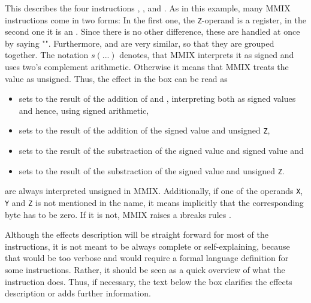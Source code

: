 \noindent This describes the four instructions , ,  and . As in this example, many MMIX instructions come in two forms: In the first one, the {\tt Z}-operand is a register, in the second one it is an . Since there is no other difference, these are handled at once by saying "". Furthermore,  and  are very similar, so that they are grouped together. The notation $s(...)$ denotes, that MMIX interprets it as signed and uses two's complement arithmetic. Otherwise it means that MMIX treats the value as unsigned. Thus, the effect in the box can be read as
\begin{itemize}
	\item {} sets  to the result of the addition of  and , interpreting both as signed values and hence, using signed arithmetic,
	\item {} sets  to the result of the addition of the signed value  and unsigned  {\tt Z},
	\item {} sets  to the result of the substraction of the signed value  and signed value  and
	\item {} sets  to the result of the substraction of the signed value  and unsigned  {\tt Z}.
\end{itemize}
 are always interpreted unsigned in MMIX. Additionally, if one of the operands {\tt X}, {\tt Y} and {\tt Z} is not mentioned in the name, it means implicitly that the corresponding byte has to be zero. If it is not, MMIX raises a \i{breaks rules} .

Although the effects description will be straight forward for most of the instructions, it is not meant to be always complete or self-explaining, because that would be too verbose and would require a formal language definition for some instructions. Rather, it should be seen as a quick overview of what the instruction does. Thus, if necessary, the text below the box clarifies the effects description or adds further information.

